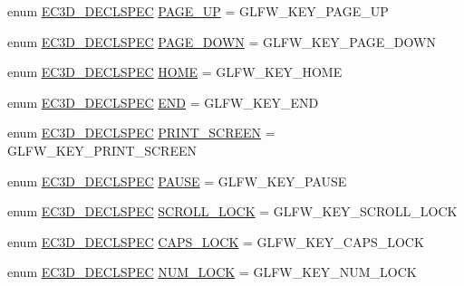 \begin{DoxyCompactItemize}
\item 
enum \mbox{\hyperlink{_common_8h_aac42573e202ca3dd4d259c81691e2369}{E\+C3\+D\+\_\+\+D\+E\+C\+L\+S\+P\+EC}} \mbox{\hyperlink{classec_1_1_keyboard_ad5fe6a8b1f9a6b71e84b6af4a0dac07c}{P\+A\+G\+E\+\_\+\+UP}} = G\+L\+F\+W\+\_\+\+K\+E\+Y\+\_\+\+P\+A\+G\+E\+\_\+\+UP
\item 
enum \mbox{\hyperlink{_common_8h_aac42573e202ca3dd4d259c81691e2369}{E\+C3\+D\+\_\+\+D\+E\+C\+L\+S\+P\+EC}} \mbox{\hyperlink{classec_1_1_keyboard_a7e897af5e7d29c6429b8bddd00a6b393}{P\+A\+G\+E\+\_\+\+D\+O\+WN}} = G\+L\+F\+W\+\_\+\+K\+E\+Y\+\_\+\+P\+A\+G\+E\+\_\+\+D\+O\+WN
\item 
enum \mbox{\hyperlink{_common_8h_aac42573e202ca3dd4d259c81691e2369}{E\+C3\+D\+\_\+\+D\+E\+C\+L\+S\+P\+EC}} \mbox{\hyperlink{classec_1_1_keyboard_ae53947399dc339c95d28af2125bc6fed}{H\+O\+ME}} = G\+L\+F\+W\+\_\+\+K\+E\+Y\+\_\+\+H\+O\+ME
\item 
enum \mbox{\hyperlink{_common_8h_aac42573e202ca3dd4d259c81691e2369}{E\+C3\+D\+\_\+\+D\+E\+C\+L\+S\+P\+EC}} \mbox{\hyperlink{classec_1_1_keyboard_a1353c7b1046a9d8d67bc9f1138a5f9f3}{E\+ND}} = G\+L\+F\+W\+\_\+\+K\+E\+Y\+\_\+\+E\+ND
\item 
enum \mbox{\hyperlink{_common_8h_aac42573e202ca3dd4d259c81691e2369}{E\+C3\+D\+\_\+\+D\+E\+C\+L\+S\+P\+EC}} \mbox{\hyperlink{classec_1_1_keyboard_a595cef3630be024a5b6ed5935372797b}{P\+R\+I\+N\+T\+\_\+\+S\+C\+R\+E\+EN}} = G\+L\+F\+W\+\_\+\+K\+E\+Y\+\_\+\+P\+R\+I\+N\+T\+\_\+\+S\+C\+R\+E\+EN
\item 
enum \mbox{\hyperlink{_common_8h_aac42573e202ca3dd4d259c81691e2369}{E\+C3\+D\+\_\+\+D\+E\+C\+L\+S\+P\+EC}} \mbox{\hyperlink{classec_1_1_keyboard_a3b4b7a8200837c4d9f01f79922a0d352}{P\+A\+U\+SE}} = G\+L\+F\+W\+\_\+\+K\+E\+Y\+\_\+\+P\+A\+U\+SE
\item 
enum \mbox{\hyperlink{_common_8h_aac42573e202ca3dd4d259c81691e2369}{E\+C3\+D\+\_\+\+D\+E\+C\+L\+S\+P\+EC}} \mbox{\hyperlink{classec_1_1_keyboard_a55be147635eeca7f44354bb7ca03ae09}{S\+C\+R\+O\+L\+L\+\_\+\+L\+O\+CK}} = G\+L\+F\+W\+\_\+\+K\+E\+Y\+\_\+\+S\+C\+R\+O\+L\+L\+\_\+\+L\+O\+CK
\item 
enum \mbox{\hyperlink{_common_8h_aac42573e202ca3dd4d259c81691e2369}{E\+C3\+D\+\_\+\+D\+E\+C\+L\+S\+P\+EC}} \mbox{\hyperlink{classec_1_1_keyboard_a3a83cb31b400e7191b369470b5a04207}{C\+A\+P\+S\+\_\+\+L\+O\+CK}} = G\+L\+F\+W\+\_\+\+K\+E\+Y\+\_\+\+C\+A\+P\+S\+\_\+\+L\+O\+CK
\item 
enum \mbox{\hyperlink{_common_8h_aac42573e202ca3dd4d259c81691e2369}{E\+C3\+D\+\_\+\+D\+E\+C\+L\+S\+P\+EC}} \mbox{\hyperlink{classec_1_1_keyboard_a0dbdacf42db0e60466bcc6287f2d21d0}{N\+U\+M\+\_\+\+L\+O\+CK}} = G\+L\+F\+W\+\_\+\+K\+E\+Y\+\_\+\+N\+U\+M\+\_\+\+L\+O\+CK

\end{DoxyCompactItemize}
